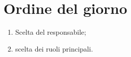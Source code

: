 \section{Ordine del giorno}

\begin{enumerate}
    \item Scelta del responsabile;
    \item scelta dei ruoli principali.
\end{enumerate}